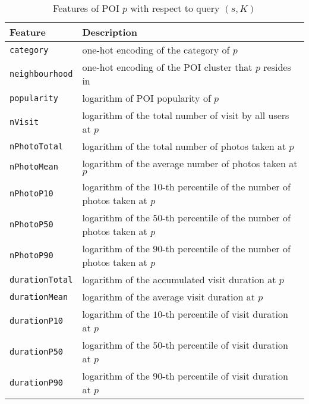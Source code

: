 \begin{table*}[ht]
\caption{Features of POI $p$ with respect to query $(s,K)$}
\label{tab:poifeature}
\centering


\setlength{\tabcolsep}{10pt} %
\begin{tabular}{l|l} \hline
\textbf{Feature}       & \textbf{Description} \\ \hline
\texttt{category}      & one-hot encoding of the category of $p$ \\
\texttt{neighbourhood} & one-hot encoding of the POI cluster that $p$ resides in \\
\texttt{popularity}    & logarithm of POI popularity of $p$ \\
\texttt{nVisit}        & logarithm of the total number of visit by all users at $p$ \\
\texttt{nPhotoTotal}   & logarithm of the total number of photos taken at $p$ \\
\texttt{nPhotoMean}    & logarithm of the average number of photos taken at $p$ \\
\texttt{nPhotoP10}     & logarithm of the $10$-th percentile of the number of photos taken at $p$ \\
\texttt{nPhotoP50}     & logarithm of the $50$-th percentile of the number of photos taken at $p$ \\
\texttt{nPhotoP90}     & logarithm of the $90$-th percentile of the number of photos taken at $p$ \\
\texttt{durationTotal} & logarithm of the accumulated visit duration at $p$ \\
\texttt{durationMean}  & logarithm of the average visit duration at $p$ \\
\texttt{durationP10}   & logarithm of the $10$-th percentile of visit duration at $p$ \\
\texttt{durationP50}   & logarithm of the $50$-th percentile of visit duration at $p$ \\
\texttt{durationP90}   & logarithm of the $90$-th percentile of visit duration at $p$ \\
\hline


\end{tabular}
\end{table*}
